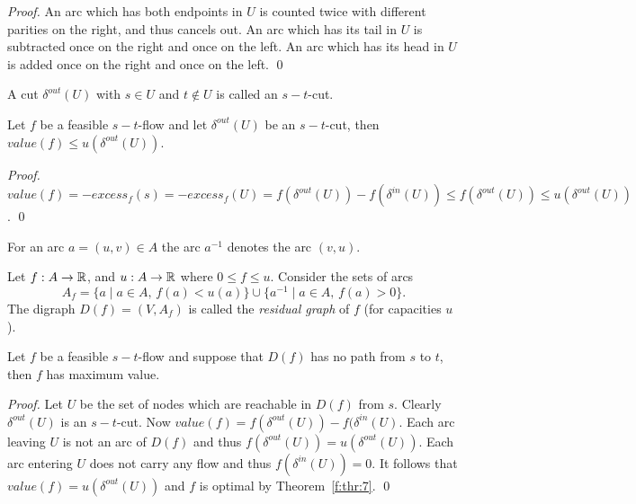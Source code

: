 \begin{proof}
  An arc which has both endpoints in $U$ is counted twice with
  different parities on the right, and thus cancels out. An arc which
  has its tail in $U$ is subtracted once on the right and once on the
  left.  An arc which has its head in $U$ is added once on the right
  and once on the left. \qed
\end{proof}

A cut $\delta^{out}(U)$ with $s \in U$  and $t \notin U$ is called an $s-t$-cut.  

\begin{theorem}
  \label{f:thr:7}
  Let $f$ be a feasible $s-t$-flow and let $\delta^{out}(U)$ be an
  $s-t$-cut, then $value(f) \leq u(\delta^{out}(U))$. 
\end{theorem}

\begin{proof}
  $value(f) = -excess_f(s) = -excess_f(U) = f(\delta^{out}(U)) -
  f(\delta^{in}(U)) \leq f(\delta^{out}(U)) \leq u(\delta^{out}(U))$. \qed
\end{proof}

For an arc $a = (u,v) \in A$ the arc $a^{-1}$ denotes the arc $(v,u)$. 

\begin{definition}
  Let $f:A \to \mathbb{R}$,  and $u: A \to \mathbb{R}$ where $0 \leq f \leq u$. Consider
  the sets of arcs
  \begin{equation}
    \label{f:eq:30}
    A_f = \{ a \mid a \in A, \, f(a) < u(a)\} \cup \{ a^{-1} \mid a \in A, \, f(a) >    0\}. 
  \end{equation}
  The digraph $D(f) = (V,A_f)$ is called the \emph{residual graph} of
  $f$ (for capacities $u$).   
\end{definition}



\begin{corollary}
  \label{co:6}
  Let $f$ be a feasible $s-t$-flow and suppose that $D(f)$ has no path
  from $s$ to $t$, then $f$ has maximum value.
\end{corollary}


\begin{proof}
  Let $U$ be the set of nodes which are reachable in $D(f)$ from
  $s$. Clearly $\delta^{out}(U)$ is an $s-t$-cut. Now $value(f) = f(\delta^{out}(U)) -
  f(\delta^{in}(U)$.  Each arc leaving $U$ is not an arc of $D(f)$ and thus
  $f(\delta^{out}(U)) = u (\delta^{out}(U))$. Each arc entering $U$ does not
  carry any flow   and thus $f(\delta^{in}(U)) = 0$. It follows that  
  $value(f) = u (\delta^{out}(U))$ and $f$ is optimal by
  Theorem~\ref{f:thr:7}.   \qed
\end{proof}

